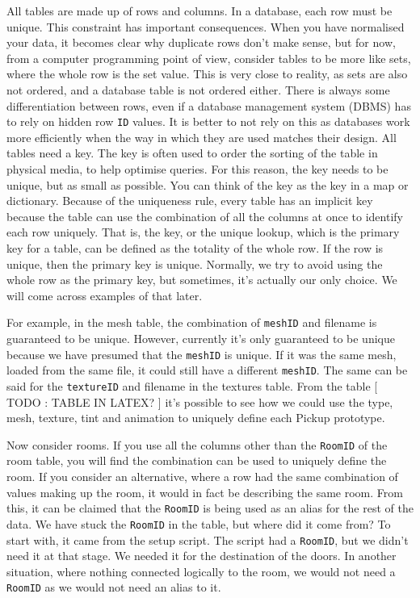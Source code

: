 \documentclass[a4paper,12pt]{book}
\begin{document}
All tables are made up of rows and columns.
In a database, each row must be unique.
This constraint has important consequences.
When you have normalised your data, it becomes clear why duplicate rows don't make sense, but for now, from a computer programming point of view, consider tables to be more like sets, where the whole row is the set value.
This is very close to reality, as sets are also not ordered, and a database table is not ordered either.
There is always some differentiation between rows, even if a database management system (DBMS) has to rely on hidden row \texttt{ID} values.
It is better to not rely on this as databases work more efficiently when the way in which they are used matches their design.
All tables need a key.
The key is often used to order the sorting of the table in physical media, to help optimise queries.
For this reason, the key needs to be unique, but as small as possible.
You can think of the key as the key in a map or dictionary.
Because of the uniqueness rule, every table has an implicit key because the table can use the combination of all the columns at once to identify each row uniquely.
That is, the key, or the unique lookup, which is the primary key for a table, can be defined as the totality of the whole row.
If the row is unique, then the primary key is unique.
Normally, we try to avoid using the whole row as the primary key, but sometimes, it's actually our only choice.
We will come across examples of that later.

For example, in the mesh table, the combination of \texttt{meshID} and filename is guaranteed to be unique.
However, currently it's only guaranteed to be unique because we have presumed that the \texttt{meshID} is unique.
If it was the same mesh, loaded from the same file, it could still have a different \texttt{meshID}.
The same can be said for the \texttt{textureID} and filename in the textures table.
From the table [ TODO : TABLE IN LATEX? ] it's possible to see how we could use the type, mesh, texture, tint and animation to uniquely define each Pickup prototype.

Now consider rooms.
If you use all the columns other than the \texttt{RoomID} of the room table, you will find the combination can be used to uniquely define the room.
If you consider an alternative, where a row had the same combination of values making up the room, it would in fact be describing the same room.
From this, it can be claimed that the \texttt{RoomID} is being used as an alias for the rest of the data.
We have stuck the \texttt{RoomID} in the table, but where did it come from?
To start with, it came from the setup script.
The script had a \texttt{RoomID}, but we didn't need it at that stage.
We needed it for the destination of the doors.
In another situation, where nothing connected logically to the room, we would not need a \texttt{RoomID} as we would not need an alias to it.
\end{document}

